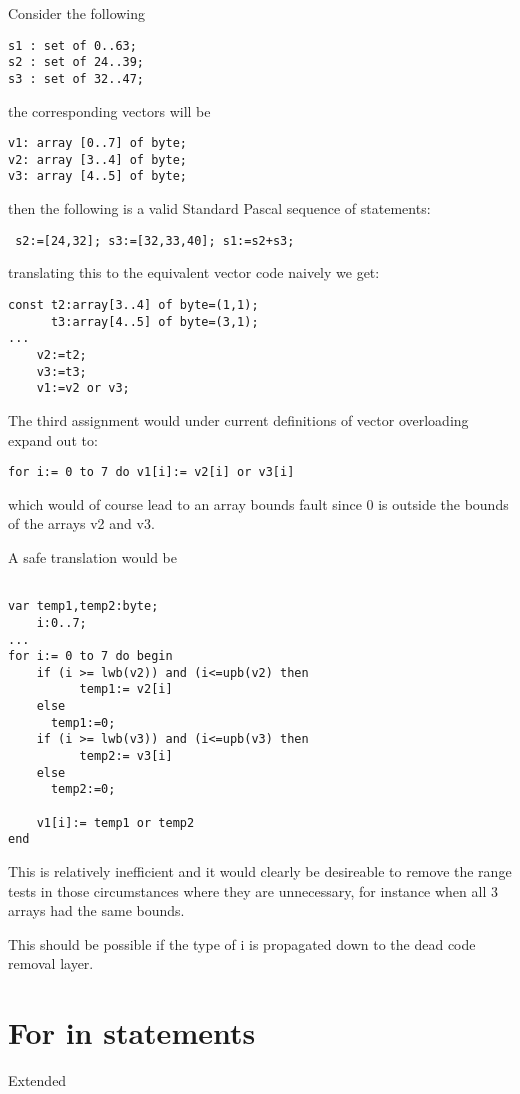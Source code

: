 Consider the following
\begin{verbatim}
s1 : set of 0..63;
s2 : set of 24..39;
s3 : set of 32..47;
\end{verbatim}
the corresponding vectors will be
\begin{verbatim}
v1: array [0..7] of byte;
v2: array [3..4] of byte;
v3: array [4..5] of byte;
\end{verbatim}then
the following is a valid Standard Pascal sequence of statements:
\begin{verbatim}
 s2:=[24,32]; s3:=[32,33,40]; s1:=s2+s3;
\end{verbatim}
translating this to the equivalent vector code naively we get:
\begin{verbatim}
const t2:array[3..4] of byte=(1,1); 
      t3:array[4..5] of byte=(3,1);
...
	v2:=t2; 
	v3:=t3; 
	v1:=v2 or v3;
\end{verbatim}
The third assignment would under current definitions of vector overloading
expand out to:
\begin{verbatim}
for i:= 0 to 7 do v1[i]:= v2[i] or v3[i]
\end{verbatim}
which would of course lead to an array bounds fault since 0 is outside the
bounds of the arrays v2 and v3.

A safe translation would be
\begin{verbatim}

var temp1,temp2:byte;
    i:0..7;
...
for i:= 0 to 7 do begin
	if (i >= lwb(v2)) and (i<=upb(v2) then 
          temp1:= v2[i]
	else
	  temp1:=0;
 	if (i >= lwb(v3)) and (i<=upb(v3) then 
          temp2:= v3[i]
	else
	  temp2:=0;

	v1[i]:= temp1 or temp2
end
\end{verbatim}

This is relatively inefficient and it would clearly be desireable to
remove the range tests in those circumstances where they are unnecessary,
for instance when all 3 arrays had the same bounds.

This should be possible if the type of i is propagated down to the 
dead code removal layer.

\section*{For in statements}
Extended

